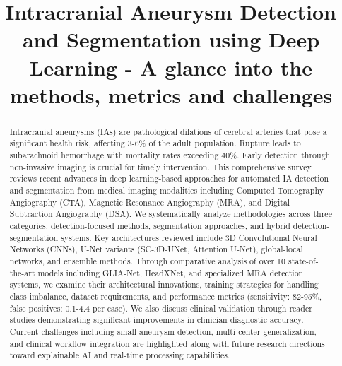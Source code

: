 \documentclass[conference]{IEEEtran}
\begin{document}
\title{Intracranial Aneurysm Detection and
Segmentation using Deep Learning - A glance into the methods, metrics and challenges}

\author{
}

\maketitle

\begin{abstract}
Intracranial aneurysms (IAs) are pathological dilations of cerebral arteries that pose a significant health risk, affecting 3-6\% of the adult population. Rupture leads to subarachnoid hemorrhage with mortality rates exceeding 40\%. Early detection through non-invasive imaging is crucial for timely intervention. This comprehensive survey reviews recent advances in deep learning-based approaches for automated IA detection and segmentation from medical imaging modalities including Computed Tomography Angiography (CTA), Magnetic Resonance Angiography (MRA), and Digital Subtraction Angiography (DSA). We systematically analyze methodologies across three categories: detection-focused methods, segmentation approaches, and hybrid detection-segmentation systems. Key architectures reviewed include 3D Convolutional Neural Networks (CNNs), U-Net variants (SC-3D-UNet, Attention U-Net), global-local networks, and ensemble methods. Through comparative analysis of over 10 state-of-the-art models including GLIA-Net, HeadXNet, and specialized MRA detection systems, we examine their architectural innovations, training strategies for handling class imbalance, dataset requirements, and performance metrics (sensitivity: 82-95\%, false positives: 0.1-4.4 per case). We also discuss clinical validation through reader studies demonstrating significant improvements in clinician diagnostic accuracy. Current challenges including small aneurysm detection, multi-center generalization, and clinical workflow integration are highlighted along with future research directions toward explainable AI and real-time processing capabilities.
\end{abstract}
\end{document}
